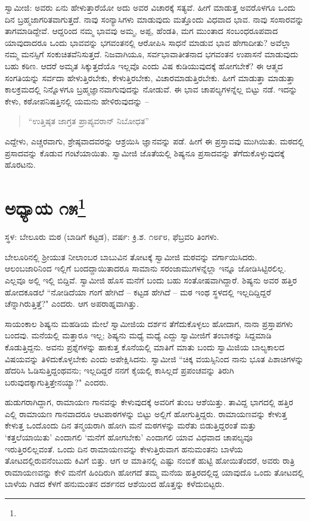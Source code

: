 ಸ್ವಾಮೀಜಿ: ಅವರು ಏನು ಹೇಳುತ್ತಾರೆಯೋ ಅದು ಅವರ ವಿಚಾರಕ್ಕೆ ಸತ್ಯವೆ. ಹೀಗೆ ಮಾಡುತ್ತ ಅವರೊಳಗೂ ಒಂದು ದಿನ ಬ್ರಹ್ಮಜಾಗರಿತವಾಗುತ್ತದೆ. ನಾವು ಸಂನ್ಯಾಸಿಗಳು ಮಾಡುವುದು ಮತ್ತೊಂದು ವಿಧವಾದ ಭಾವ. ನಾವು ಸಂಸಾರವನ್ನು ತಾಗಮಾಡಿದ್ದೇವೆ. ಆದ್ದರಿಂದ ನಮ್ಮ ಭಾವವು ಅಮ್ಮ, ಅಪ್ಪ, ಹೆಂಡತಿ, ಮಗ ಮುಂತಾದ ಸಂಬಂಧರೂಪವಾದ ಯಾವುದಾದರೂ ಒಂದು ಭಾವವನ್ನು ಭಗವಂತನಲ್ಲಿ ಆರೋಪಿಸಿ ಸಾಧನೆ ಮಾಡುವ ಭಾವ ಹೇಗಾದೀತು? ಅವೆಲ್ಲಾ ನಮ್ಮ ಮನಸ್ಸಿಗೆ ಸಂಕುಚಿತವೆನಿಸುತ್ತದೆ. ನಿಜವಾಗಿಯೂ, ಸರ್ವಭಾವಾತೀತನಾದ ಭಗವಂತನ ಉಪಾಸನೆ ಮಾಡುವುದು ಬಹು ಕಠಿಣ. ಆದರೆ ಅಮೃತ ಸಿಕ್ಕುತ್ತದೆಯೊ ಇಲ್ಲವೊ ಎಂದು ವಿಷ ಕುಡಿಯುವುದಕ್ಕೆ ಹೋಗಬೇಕೆ? ಈ ಆತ್ಮದ ಸಂಗತಿಯನ್ನು ಸರ್ವದಾ ಹೇಳುತ್ತಿರಬೇಕು, ಕೇಳುತ್ತಿರಬೇಕು, ವಿಚಾರಮಾಡುತ್ತಿರಬೇಕು. ಹೀಗೆ ಮಾಡುತ್ತಾ ಮಾಡುತ್ತಾ ಕಾಲಕ್ರಮದಲ್ಲಿ ನಿನ್ನೊಳಗೂ ಬ್ರಹ್ಮಜ್ಞಾನವಾಗುವುದನ್ನು ನೋಡುವೆ. ಈ ಭಾವ ಚಾಪಲ್ಯಗಳನ್ನೆಲ್ಲ ಬಿಟ್ಟು ನಡೆ. ಇದನ್ನು ಕೇಳು, ಕಠೋಪನಿಷತ್ತಿನಲ್ಲಿ ಯಮನು ಹೇಳಿರುವುದನ್ನು –

\begin{verse}
“ಉತ್ತಿಷ್ಠತ ಜಾಗ್ರತ ಪ್ರಾಪ್ಯವರಾನ್ ನಿಬೋಧತ”
\end{verse}

ಎದ್ದೇಳು, ಎಚ್ಚರವಾಗು, ಶ್ರೇಷ್ಠವಾದವರನ್ನು ಆಶ್ರಯಿಸಿ ಜ್ಞಾನವನ್ನು ಪಡೆ. ಹೀಗೆ ಈ ಪ್ರಸ್ತಾವವು ಮುಗಿಯಿತು. ಮಠದಲ್ಲಿ ಪ್ರಸಾದವನ್ನು ಕೊಡುವ ಗಂಟೆಯಾಯಿತು. ಸ್ವಾಮೀಜಿ ಜೊತೆಯಲ್ಲಿ ಶಿಷ್ಯನೂ ಪ್ರಸಾದವನ್ನು ತೆಗೆದುಕೊಳ್ಳುವುದಕ್ಕೆ ಹೊರಟನು.

\newpage

\chapter[ಅಧ್ಯಾಯ ೧೫]{ಅಧ್ಯಾಯ ೧೫\protect\footnote{}}

\centerline{ಸ್ಥಳ: ಬೇಲೂರು ಮಠ (ಬಾಡಿಗೆ ಕಟ್ಟಡ), ವರ್ಷ: ಕ್ರಿ.ಶ. ೧೮೯೮, ಫೆಬ್ರವರಿ ತಿಂಗಳು.}

ಬೇಲೂರಿನಲ್ಲಿ ಶ‍್ರೀಯುತ ನೀಲಾಂಬರ ಬಾಬುವಿನ ತೋಟಕ್ಕೆ ಸ್ವಾಮೀಜಿ ಮಠವನ್ನು ವರ್ಗಾಯಿಸಿದರು. ಆಲಂಬಜಾರಿನಿಂದ ಇಲ್ಲಿಗೆ ಬಂದದ್ದಾಯಿತಾದರೂ ಸಾಮಾನು ಸರಂಜಾಮುಗಳನ್ನೆಲ್ಲಾ ಇನ್ನೂ ಜೋಡಿಸಿಟ್ಟಿರಲಿಲ್ಲ. ಎಲ್ಲವೂ ಅಲ್ಲಿ ಇಲ್ಲಿ ಬಿದ್ದಿವೆ. ಸ್ವಾಮೀಜಿ ಹೊಸ ಮನೆಗೆ ಬಂದು ಬಹು ಸಂತೋಷವಾಗಿದ್ದಾರೆ. ಶಿಷ್ಯನು ಅವರ ಹತ್ತಿರ ಹೋದಕೂಡಲೆ “ನೋಡಿದೆಯಾ ಗಂಗೆ ಹೇಗಿದೆ – ಕಟ್ಟಡ ಹೇಗಿದೆ – ಮಠ ಇಂಥ ಸ್ಥಳದಲ್ಲಿ ಇಲ್ಲದಿದ್ದಿದ್ದರೆ ಚೆನ್ನಾಗಿರುತ್ತಿತ್ತೆ?" ಎಂದರು. ಆಗ ಅಪರಾಹ್ನವಾಗಿತ್ತು.

ಸಾಯಂಕಾಲ ಶಿಷ್ಯನು ಮಹಡಿಯ ಮೇಲೆ ಸ್ವಾಮೀಜಿಯ ದರ್ಶನ ತೆಗೆದುಕೊಳ್ಳಲು ಹೋದಾಗ, ನಾನಾ ಪ್ರಸ್ತಾಪಗಳು ಬಂದವು. ಮನೆಯಲ್ಲಿ ಮತ್ತಾರೂ ಇಲ್ಲ; ಶಿಷ್ಯನು ಮಧ್ಯೆ ಮಧ್ಯೆ ಎದ್ದು ಸ್ವಾಮೀಜಿಗೆ ತಂಬಾಕನ್ನು ಸಿದ್ದಮಾಡಿ ಕೊಡುತ್ತಿದ್ದನು. ಅವನು ಪ್ರಶ್ನೆಗಳನ್ನು ಹಾಕುತ್ತ ಕೊನೆಯಲ್ಲಿ ಮಾತಿಗೆ ಮಾತು ಬಂದು ಸ್ವಾಮಿಜಿಯ ಬಾಲ್ಯಕಾಲದ ವಿಷಯವನ್ನು ತಿಳಿದುಕೊಳ್ಳಬೇಕು ಎಂದು ಅಪೇಕ್ಷಿಸಿದನು. ಸ್ವಾಮೀಜಿ “ಚಿಕ್ಕ ವಯಸ್ಸಿನಿಂದ ನಾನು ಭೂತ ಪಿಶಾಚಿಗಳನ್ನು ಹೆದರಿಸಿ ಓಡಿಸುತ್ತಿದ್ದಂಥವನು; ಇಲ್ಲದಿದ್ದರೆ ನನಗೆ ಕೈಯಲ್ಲಿ ಕಾಸಿಲ್ಲದೆ ಪ್ರಪಂಚವನ್ನು ತಿರುಗಿ ಬರುವುದಕ್ಕಾಗುತ್ತಿತ್ತೇನಯ್ಯಾ?" ಎಂದರು.

ಹುಡುಗರಾಗಿದ್ದಾಗ, ರಾಮಾಯಣ ಗಾನವನ್ನು ಕೇಳುವುದಕ್ಕೆ ಅವರಿಗೆ ತುಂಬ ಆಶೆಯಿತ್ತು. ತಾವಿದ್ದ ಭಾಗದಲ್ಲಿ ಹತ್ತಿರ ಎಲ್ಲಿ ರಾಮಾಯಣ ಗಾನವಾದರೂ ಆಟಪಾಠಗಳನ್ನು ಬಿಟ್ಟು ಅಲ್ಲಿಗೆ ಹೋಗುತ್ತಿದ್ದರು. ರಾಮಾಯಣವನ್ನು ಕೇಳುತ್ತ ಕೇಳುತ್ತ ಒಂದೊಂದು ದಿನ ತನ್ಮಯರಾಗಿ ಹೋಗಿ ಮನೆ ಮಠಗಳನ್ನು ಮರೆತು ಬಿಡುತ್ತಿದ್ದರಂತೆ ಮತ್ತು ‘ಕತ್ತಲೆಯಾಯಿತು’ ಎಂದಾಗಲಿ ‘ಮನೆಗೆ ಹೋಗಬೇಕು’ ಎಂದಾಗಲಿ ಯಾವ ವಿಧವಾದ ಚಾಪಲ್ಯವೂ ಇರುತ್ತಿರಲಿಲ್ಲವಂತೆ. ಒಂದು ದಿನ ರಾಮಾಯಣವನ್ನು ಕೇಳುತ್ತಿರುವಾಗ ಹನುಮಂತನು ಬಾಳೆಯ ತೋಟದಲ್ಲಿರುವನೆಂಬುದು ಕಿವಿಗೆ ಬಿತ್ತು. ಆಗ ಆ ಮಾತಿನಲ್ಲಿ ಎಷ್ಟು ನಂಬಿಕೆ ಹುಟ್ಟಿ ಹೋಯಿತೆಂದರೆ, ಅವರು ರಾತ್ರಿ ರಾಮಾಯಣವನ್ನು ಕೇಳಿ ಮನೆಗೆ ಹಿಂದಿರುಗಿ ಹೋಗದೆ ತಮ್ಮ ಮನೆಯ ಹತ್ತಿರದಲ್ಲಿದ್ದ ಯಾವುದೊ ಒಂದು ತೋಟದಲ್ಲಿ ಬಾಳೆಯ ಗಿಡದ ಕೆಳಗೆ ಹನುಮಂತನ ದರ್ಶನದ ಆಶೆಯಿಂದ ಹೊತ್ತನ್ನು ಕಳೆದುಬಿಟ್ಟರು.

